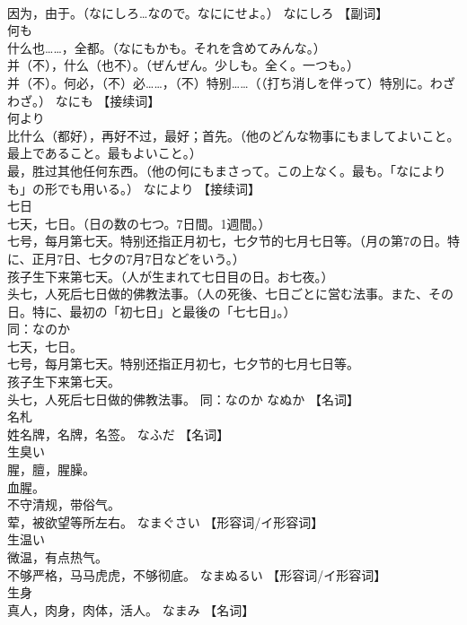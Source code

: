 \documentclass[8pt]{extreport}
\begin{document}
\begin{CJK}{UTF8}{min}
\\	因为，由于。（なにしろ…なので。なににせよ。）	なにしろ		【副词】
\\	何も	
\\	什么也……，全都。（なにもかも。それを含めてみんな。） 
\\	并（不），什么（也不）。（ぜんぜん。少しも。全く。一つも。） 
\\	并（不）。何必，（不）必……，（不）特别……（（打ち消しを伴って）特別に。わざわざ。）	なにも		【接续词】
\\	何より	
\\	比什么（都好），再好不过，最好；首先。（他のどんな物事にもましてよいこと。最上であること。最もよいこと。） 
\\	最，胜过其他任何东西。（他の何にもまさって。この上なく。最も。「なによりも」の形でも用いる。）	なにより		【接续词】
\\	七日	
\\	七天，七日。（日の数の七つ。7日間。1週間。） 
\\	七号，每月第七天。特别还指正月初七，七夕节的七月七日等。（月の第7の日。特に、正月7日、七夕の7月7日などをいう。） 
\\	孩子生下来第七天。（人が生まれて七日目の日。お七夜。） 
\\	头七，人死后七日做的佛教法事。（人の死後、七日ごとに営む法事。また、その日。特に、最初の「初七日」と最後の「七七日」。） 
\\	同：なのか 
\\	七天，七日。 
\\	七号，每月第七天。特别还指正月初七，七夕节的七月七日等。 
\\	孩子生下来第七天。 
\\	头七，人死后七日做的佛教法事。 同：なのか	なぬか		【名词】
\\	名札	
\\	姓名牌，名牌，名签。	なふだ		【名词】
\\	生臭い	
\\	腥，膻，腥臊。 
\\	血腥。 
\\	不守清规，带俗气。 
\\	荤，被欲望等所左右。	なまぐさい		【形容词/イ形容词】
\\	生温い	
\\	微温，有点热气。 
\\	不够严格，马马虎虎，不够彻底。	なまぬるい		【形容词/イ形容词】
\\	生身	
\\	真人，肉身，肉体，活人。	なまみ		【名词】

\end{CJK}
\end{document}
